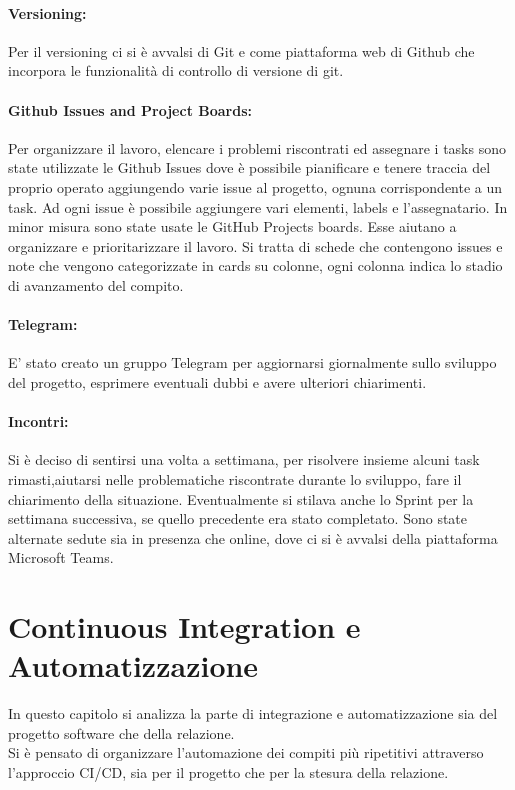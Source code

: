     \paragraph{Versioning: }
    Per il versioning ci si è avvalsi di Git e come piattaforma web di Github che incorpora le funzionalità di controllo di versione di git. 
    
    \paragraph{Github Issues and Project Boards: }
    
    Per organizzare il lavoro, elencare i problemi riscontrati ed assegnare i tasks sono state utilizzate le Github Issues dove è possibile pianificare e tenere traccia del proprio operato aggiungendo varie issue al progetto, ognuna corrispondente a un task. Ad ogni issue è possibile aggiungere vari elementi, labels e l'assegnatario. \newline In minor misura sono state usate le GitHub Projects boards. Esse aiutano a organizzare e prioritarizzare il lavoro. Si tratta di schede che contengono issues e note che vengono categorizzate in cards su colonne, ogni colonna indica lo stadio di avanzamento del compito.
   
    \paragraph{Telegram: }
    E' stato creato un gruppo Telegram per aggiornarsi giornalmente sullo sviluppo del progetto, esprimere eventuali dubbi e avere ulteriori chiarimenti. 
    
    \paragraph{Incontri: }
    Si è deciso di sentirsi una volta a settimana, per risolvere insieme alcuni task rimasti,aiutarsi nelle problematiche riscontrate durante lo sviluppo, fare il chiarimento della situazione. Eventualmente si stilava anche lo Sprint per la settimana successiva, se quello precedente era stato completato. Sono state alternate sedute sia in presenza che online, dove ci si è avvalsi della piattaforma Microsoft Teams.
    
     

\section{Continuous Integration e Automatizzazione}
\label{chap:CI}
In questo capitolo si analizza la parte di integrazione e automatizzazione sia del progetto software che della relazione.\\  Si è pensato di organizzare l'automazione dei compiti più ripetitivi attraverso l'approccio CI/CD, sia per il progetto che per la stesura della relazione.
